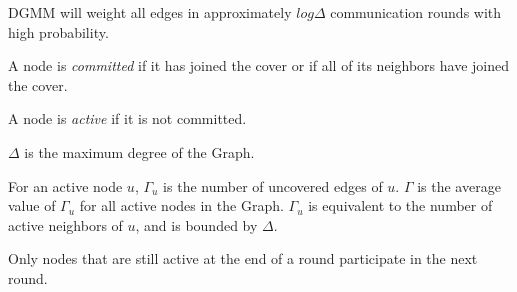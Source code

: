 \begin{lem}
  \label{lem:dgmm-delta}
  DGMM will weight all edges in approximately $log\Delta$ communication rounds with high probability.
\end{lem}

\begin{ldef}
A node is {\em committed} if it has joined the cover or if all of its neighbors have joined the cover.
\end{ldef}
\begin{ldef}
A node is {\em active} if it is not committed.
\end{ldef}
\begin{ldef}
$\Delta$ is the maximum degree of the Graph.
\end{ldef}
\begin{ldef}
\label{def:gamma}
For an active node $u$, $\Gamma_u$ is the number of uncovered edges of $u$. $\Gamma$ is the average value of $\Gamma_u$ for all active nodes in the Graph. $\Gamma_u$ is equivalent to the number of active neighbors of $u$, and is bounded by $\Delta$.
\end{ldef}
\begin{note}
Only nodes that are still active at the end of a round participate in the next round. 
\end{note}
 
